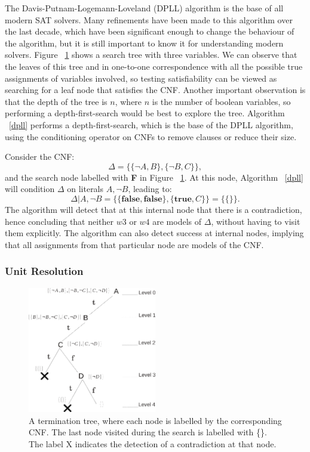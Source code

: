 \documentclass[12pt]{diicc}
\begin{document}
The Davis-Putnam-Logemann-Loveland (DPLL) \cite{dpll} algorithm is the base of all modern SAT solvers. Many refinements have been made to this algorithm over the last decade, which have been significant enough to change the behaviour of the algorithm, but it is still important to know it for understanding modern solvers. Figure ~\ref{fig:searchtree} shows a search tree with three variables. We can observe that the leaves of this tree and in one-to-one correspondence with all the possible true assignments of variables involved, so testing satisfiability can be viewed as searching for a leaf node that satisfies the CNF. Another important observation is that the depth of the tree is $n$, where $n$ is the number of boolean variables, so performing a depth-first-search would be best to explore the tree. Algorithm ~\ref{dpll} performs a depth-first-search, which is the base of the DPLL algorithm, using the conditioning operator on CNFs to remove clauses or reduce their size.

Consider the CNF:
\[\Delta=\{\{\neg A,B\},\{\neg B,C\}\},\]
and the search node labelled with \textbf{F} in Figure ~\ref{fig:searchtree}. At this node, Algorithm ~\ref{dpll} will condition $\Delta$ on literals $A,\neg B$, leading to:
\[\Delta |A,\neg B=\{ \{\textbf{false},\textbf{false}\},\{\textbf{true},C\}\}=\{\{\}\}.\]
The algorithm will detect that at this internal node that there is a contradiction, hence concluding that neither $w3$ or $w4$ are models of $\Delta$, without having to visit them explicitly. The algorithm can also detect success at internal nodes, implying that all assignments from that particular node are models of the CNF.

\subsubsection{Unit Resolution}

\begin{figure}[h!]
	\centering
		\includegraphics[width=0.5\textwidth]{termination_tree}
	\caption{A termination tree, where each node is labelled by the corresponding CNF. The last node visited during the search is labelled with \{\}. The label X indicates the detection of a contradiction at that node.}
	\label{fig:searchtree}
\end{figure}
\end{document}
